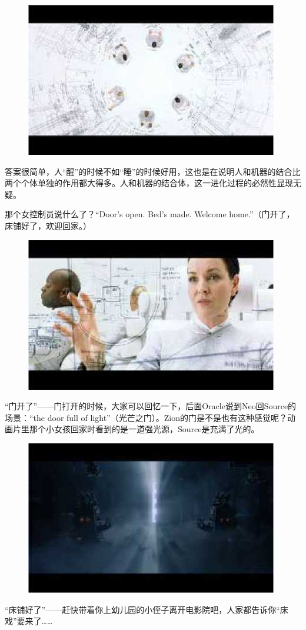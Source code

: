 \documentclass{ctexart}
\begin{document}
\begin{figure}[htb]
\centering
\includegraphics[width=0.5\linewidth]{fig/read_reloaded-32}
\end{figure}

答案很简单，人“醒”的时候不如“睡”的时候好用，这也是在说明人和机器的结合比两个个体单独的作用都大得多。人和机器的结合体，这一进化过程的必然性显现无疑。

那个女控制员说什么了？“Door’s open. Bed’s made. Welcome home.”（门开了，床铺好了，欢迎回家。）

\begin{figure}[htb]
\centering
\includegraphics[width=0.5\linewidth]{fig/read_reloaded-33}
\end{figure}

“门开了”——门打开的时候，大家可以回忆一下，后面Oracle说到Neo回Source的场景：“the door full of light”（光芒之门）。Zion的门是不是也有这种感觉呢？动画片里那个小女孩回家时看到的是一道强光源，Source是充满了光的。

\begin{figure}[htb]
\centering
\includegraphics[width=0.5\linewidth]{fig/read_reloaded-34}
\end{figure}

“床铺好了”——赶快带着你上幼儿园的小侄子离开电影院吧，人家都告诉你“床戏”要来了……
\end{document}
